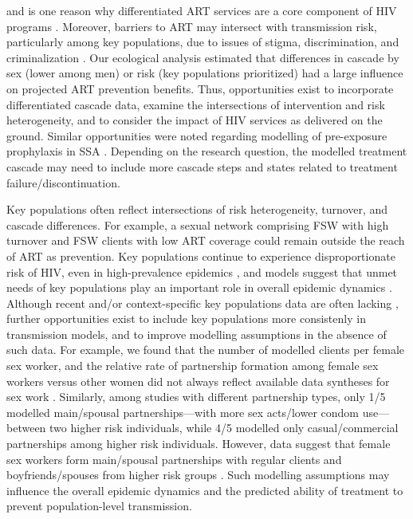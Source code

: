 and is one reason why differentiated ART services are a core component of HIV programs
\cite{Chikwari2018,Ehrenkranz2019}.
Moreover, barriers to ART may intersect with transmission risk, particularly among key populations,
due to issues of stigma, discrimination, and criminalization \cite{Ortblad2019,Baral2019}.
Our ecological analysis estimated that
differences in cascade by sex (lower among men) or risk (key populations prioritized)
had a large influence on projected ART prevention benefits.
Thus, opportunities exist to incorporate differentiated cascade data,
examine the intersections of intervention and risk heterogeneity, and
to consider the impact of HIV services as delivered on the ground.
Similar opportunities were noted regarding modelling of pre-exposure prophylaxis in SSA \cite{Case2019}.
Depending on the research question, the modelled treatment cascade may need
to include more cascade steps and states related to treatment failure/discontinuation.
\par
Key populations often reflect intersections of risk heterogeneity, turnover, and cascade differences.
For example, a sexual network comprising FSW with high turnover and FSW clients with low ART coverage
could remain outside the reach of ART as prevention.
Key populations continue to experience disproportionate risk of HIV,
even in high-prevalence epidemics \cite{Baral2012,Beyrer2012},
and models suggest that unmet needs of key populations
play an important role in overall epidemic dynamics \cite{Bekker2015,Stone2021}.
Although recent and/or context-specific key populations data are often lacking \cite{Rao2018},
further opportunities exist to include key populations more consistenly in transmission models,
and to improve modelling assumptions in the absence of such data.
For example, we found that the number of modelled clients per female sex worker, and
the relative rate of partnership formation among female sex workers versus other women
did not always reflect available data syntheses for sex work \cite{Watts2010,Scorgie2012}.
Similarly, among studies with different partnership types, only 1/5 modelled
main/spousal partnerships---with more sex acts/lower condom use---between two higher risk individuals,
while 4/5 modelled only casual/commercial partnerships among higher risk individuals.
However, data suggest that female sex workers form main/spousal partnerships
with regular clients and boyfriends/spouses from higher risk groups \cite{Scorgie2012}.
Such modelling assumptions may influence the overall epidemic dynamics
and the predicted ability of treatment to prevent population-level transmission.
